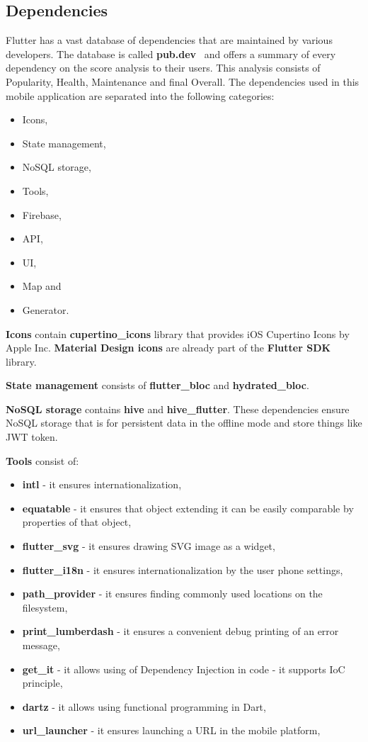 \subsection{Dependencies}\label{subsec:dependencies}
Flutter has a vast database of dependencies that are maintained by various developers.
The database is called \textbf{pub.dev}~\cite{pubDev}  and offers a summary of every dependency on the score analysis to their users.
This analysis consists of Popularity, Health, Maintenance and final Overall.
The dependencies used in this mobile application are separated into the following categories:
\begin{itemize}
    \item Icons,
    \item State management,
    \item NoSQL storage,
    \item Tools,
    \item Firebase,
    \item API,
    \item UI,
    \item Map and
    \item Generator.
\end{itemize}

\textbf{Icons} contain \textbf{cupertino\_icons} library that provides iOS Cupertino Icons by Apple Inc.
\textbf{Material Design icons} are already part of the \textbf{Flutter SDK} library.

\textbf{State management} consists of \textbf{flutter\_bloc} and \textbf{hydrated\_bloc}.

\textbf{NoSQL storage} contains \textbf{hive} and \textbf{hive\_flutter}.
These dependencies ensure NoSQL storage that is for persistent data in the offline mode and store things like JWT token.\cite{jwtToken}

\textbf{Tools} consist of:
\begin{itemize}
    \item \textbf{intl} - it ensures internationalization,
    \item \textbf{equatable} - it ensures that object extending it can be easily comparable by properties of that object,
    \item \textbf{flutter\_svg} - it ensures drawing SVG image as a widget,
    \item \textbf{flutter\_i18n} - it ensures internationalization by the user phone settings,
    \item \textbf{path\_provider} - it ensures finding commonly used locations on the filesystem,
    \item \textbf{print\_lumberdash} - it ensures a convenient debug printing of an error message,
    \item \textbf{get\_it} - it allows using of Dependency Injection in code - it supports IoC principle,\cite{iocPrinciple}
    \item \textbf{dartz} - it allows using functional programming in Dart,
    \item \textbf{url\_launcher} - it ensures launching a URL in the mobile platform,
\end{itemize}

